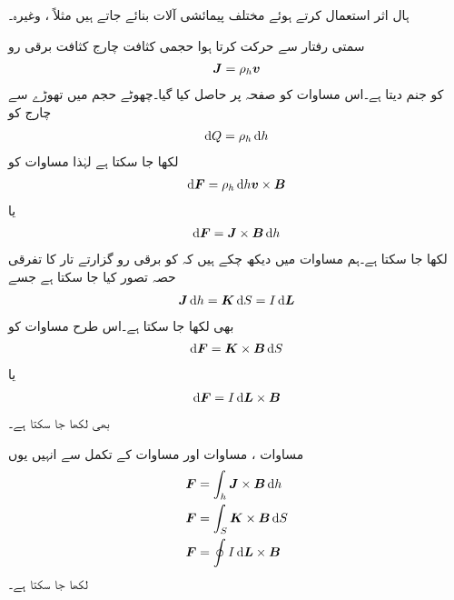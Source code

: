ہال اثر استعمال کرتے ہوئے مختلف پیمائشی آلات بنائے جاتے ہیں مثلاً ،  وغیرہ۔

سمتی رفتار  سے حرکت کرتا ہوا حجمی کثافت چارج   کثافت برقی رو 
\begin{align}
{\ensuremath{{\boldsymbol{J}}}}=\rho_h {{\boldsymbol{v}}}
\end{align}
کو جنم دیتا ہے۔اس مساوات کو صفحہ  پر حاصل کیا گیا۔چھوٹے حجم  میں تھوڑے سے چارج کو
\begin{align}
\dif Q=\rho_h \dif h
\end{align}
لکھا جا سکتا ہے لہٰذا مساوات  کو
\begin{align*}
\dif \kvec{F}=\rho_h \dif h \kvec{v} \times \kvec{B}
\end{align*}
یا
\begin{align}\label{مساوات_امالہ_لورنز_تفرقی_الف}
\dif \kvec{F}=\kvec{J} \times \kvec{B} \dif h
\end{align}
لکھا جا سکتا ہے۔ہم مساوات  میں دیکھ چکے ہیں کہ  کو برقی رو گزارتے تار کا تفرقی حصہ تصور کیا جا سکتا ہے جسے 
\begin{align*}
\kvec{J} \dif h=\kvec{K} \dif S=I \dif \kvec{L}
\end{align*}
بھی لکھا جا سکتا ہے۔اس طرح مساوات  کو
\begin{align}\label{مساوات_امالہ_لورنز_تفرقی_ب}
\dif \kvec{F}=\kvec{K} \times \kvec{B} \dif S
\end{align}
یا 
\begin{align}\label{مساوات_امالہ_لورنز_تفرقی_پ}
\dif \kvec{F}=I \dif \kvec{L} \times \kvec{B}
\end{align}
بھی لکھا جا سکتا ہے۔

مساوات ، مساوات  اور مساوات  کے تکمل سے انہیں یوں
\begin{align}
\kvec{F}&=\int_h \kvec{J} \times \kvec{B} \dif h \label{مساوات_امالہ_لورنز_تتکمل_ت}\\
\kvec{F}&=\int_S \kvec{K} \times \kvec{B} \dif S \label{مساوات_امالہ_لورنز_تتکمل_ٹ}\\
\kvec{F}&=\oint I \dif \kvec{L} \times \kvec{B} \label{مساوات_امالہ_لورنز_تتکمل_پ}
\end{align}
لکھا جا سکتا ہے۔

